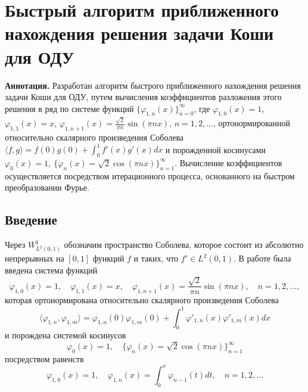 
\section{Быстрый алгоритм приближенного нахождения решения задачи Коши для ОДУ}


\textbf{ Аннотация.} Разработан алгоритм быстрого приближенного нахождения решения задачи Коши для ОДУ, путем вычисления коэффициентов разложения этого решения в ряд по системе функций $\{\varphi_{1,n}(x)\}_{n=0}^{\infty}$, где $ \varphi_{1,0}(x)=1$, $\varphi_{1,1}(x)=x$, $\varphi_{1,n+1}(x)=\frac{\sqrt{2}}{\pi n}\sin(\pi nx)$, $n=1,2,\ldots$,
ортонормированной относительно скалярного произведения Соболева $\langle f, g\rangle=f(0)g(0)+\int_0^1f'(x)g'(x)dx$ и порожденной
косинусами $\varphi_0(x)=1,\ \{\varphi_n(x)=\sqrt{2}\cos(\pi nx)\}_{n=1}^\infty$.
Вычисление коэффициентов осуществляется посредством итерационного процесса, основанного на быстром преобразовании Фурье.


\subsection{Введение}

Через $W^1_{L^2(0,1)}$ обозначим пространство Соболева, которое состоит из абсолютно непрерывных на $[0,1]$ функций $f$ и таких, что $f{'}\in L^2(0,1)$.
В работе \cite{RamShaMag} была введена система функций
\begin{equation}\label{GasRam-eq1}
 \varphi_{1,0}(x)=1,\quad \varphi_{1,1}(x)=x,\quad \varphi_{1,n+1}(x)=\frac{\sqrt{2}}{\pi n}\sin(\pi nx),\quad n=1,2,\ldots,
\end{equation}
которая ортонормирована относительно скалярного произведения Соболева
\begin{equation*}
\langle\varphi_{1,n},\varphi_{1,m}\rangle=\varphi_{1,n}(0)\varphi_{1,m}(0)+\int_0^1\varphi'_{1,n}(x)\varphi'_{1,m}(x)dx
\end{equation*}
и порождена системой косинусов
\begin{equation}\label{GasRam-eq2}
\varphi_0(x)=1,\quad \{\varphi_n(x)=\sqrt{2}\cos(\pi nx)\}_{n=1}^\infty
\end{equation}
посредством равенств
$$
 \varphi_{1,0}(x)=1,\quad \varphi_{1,n}(x)=\int_0^x \varphi_{n-1}(t)dt, \quad n=1,2,\ldots
$$

